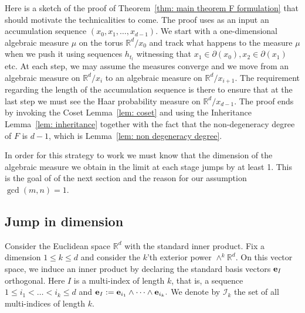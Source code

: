 \documentclass[reqno,11pt, twoside]{amsart}
\theoremstyle{plain}
\theoremstyle{definition}
\theoremstyle{definition}
\theoremstyle{remark}
\numberwithin{equation}{section}
\newcommand{\R}{{\mathbb{R}}}
\newcommand{\ve}{{\bf e}}
\newcommand{\cI}{\mathcal{I}}
\newcommand{\bR}{\mathbb{R}}
\begin{document}
Here is a sketch of the proof of Theorem~\ref{thm: main theorem F formulation} that should motivate the technicalities to come. 
The proof uses as an input
an accumulation sequence $(x_0,x_1,\dots, x_{d-1})$. We start with a one-dimensional algebraic measure $\mu$ on the torus $\bR^d/x_0$ and track what happens to the measure $\mu$ when we push it using sequences $h_{t_l}$ witnessing 
that $x_1\in \partial(x_0),x_2\in \partial(x_1)$ etc. At each step, we may assume the measures converge and we move from an algebraic measure on $\bR^d/x_i$ to an algebraic measure on $\bR^d/x_{i+1}$. The requirement 
regarding the length of the accumulation sequence is there to ensure that at the last step we must see the Haar probability measure on $\bR^d/x_{d-1}.$
The proof ends by invoking the Coset Lemma~\ref{lem: coset} and using the Inheritance Lemma~\ref{lem: inheritance} together with the fact that the non-degeneracy degree of $F$ is $d-1$, which is Lemma~\ref{lem: non degeneracy degree}. 

In order for this strategy to work we must know that the dimension of the algebraic measure we obtain in the limit at each stage jumps by at least 1. This is  the goal of of the next section and the reason for our assumption 
$\gcd(m,n)=1$.
\subsection{Jump in dimension}
    Consider the Euclidean space $\R^d$ with the standard inner product. Fix a dimension $1\le k\le d$ and consider the $k$'th exterior power
    $
        \wedge^k \R^d. 
    $
    On this vector space, we induce an inner product by declaring the standard basis vectors $\ve_I$ orthogonal. Here $I$ is a multi-index of length $k$, that is,
    a sequence $1\le i_1 < \dots < i_k \le d$ and 
    $\ve_I:=\ve_{i_1}\wedge \dots \wedge \ve_{i_k}.$ We denote by $\cI_k$ the set of all multi-indices of length $k$.
    
\end{document}
